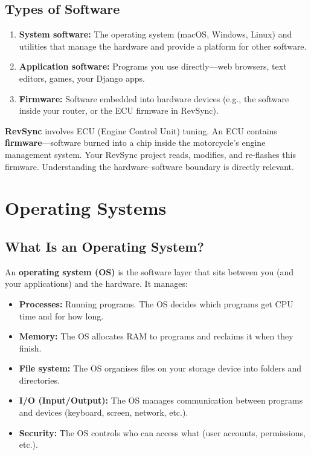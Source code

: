 \documentclass[12pt, a4paper, oneside]{book}
\begin{document}
\subsection{Types of Software}

\begin{enumerate}[leftmargin=2em]
    \item \textbf{System software:} The operating system (macOS, Windows, Linux) and utilities that manage the hardware and provide a platform for other software.
    \item \textbf{Application software:} Programs you use directly---web browsers, text editors, games, your Django apps.
    \item \textbf{Firmware:} Software embedded into hardware devices (e.g., the software inside your router, or the ECU firmware in RevSync).
\end{enumerate}

\begin{projectbox}
\textbf{RevSync} involves ECU (Engine Control Unit) tuning. An ECU contains \textbf{firmware}---software burned into a chip inside the motorcycle's engine management system. Your RevSync project reads, modifies, and re-flashes this firmware. Understanding the hardware--software boundary is directly relevant.
\end{projectbox}

\section{Operating Systems}

\subsection{What Is an Operating System?}

An \textbf{operating system (OS)} is the software layer that sits between you (and your applications) and the hardware. It manages:

\begin{itemize}[leftmargin=2em]
    \item \textbf{Processes:} Running programs. The OS decides which programs get CPU time and for how long.
    \item \textbf{Memory:} The OS allocates RAM to programs and reclaims it when they finish.
    \item \textbf{File system:} The OS organises files on your storage device into folders and directories.
    \item \textbf{I/O (Input/Output):} The OS manages communication between programs and devices (keyboard, screen, network, etc.).
    \item \textbf{Security:} The OS controls who can access what (user accounts, permissions, etc.).
\end{itemize}
\end{document}
